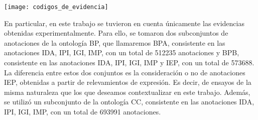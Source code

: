 \begin{center}
    \texttt{[image: codigos\_de\_evidencia]}
    \label{fig:codigos_de_evidencia}
\end{center}
En particular, en este trabajo se tuvieron en cuenta únicamente las evidencias obtenidas experimentalmente. Para ello, se tomaron dos subconjuntos de anotaciones de la ontología BP, que llamaremos BPA, consistente en las anotaciones IDA, IPI, IGI, IMP, con un total de 512235 anotaciones y BPB, consistente en las anotaciones IDA, IPI, IGI, IMP y IEP, con un total de 573688. La diferencia entre estos dos conjuntos es la consideración o no de anotaciones IEP, obtenidas a partir de relevamientos de expresión. Es decir, de ensayos de la misma naturaleza que los que deseamos contextualizar en este trabajo. Además, se utilizó un subconjunto de la ontología CC, consistente en las anotaciones IDA, IPI, IGI, IMP, con un total de 693991 anotaciones. \cite{Pandey2008, Resnik1995, Bose2016, Pesquita2009, Berenstein2014, Ashburner}

